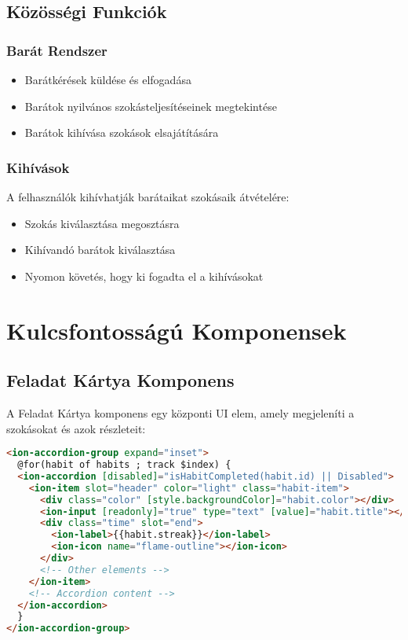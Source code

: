 \documentclass[12pt,a4paper]{report}
\begin{document}
\section{Közösségi Funkciók}
\subsection{Barát Rendszer}
\begin{itemize}
    \item Barátkérések küldése és elfogadása
    \item Barátok nyilvános szokásteljesítéseinek megtekintése
    \item Barátok kihívása szokások elsajátítására
\end{itemize}

\subsection{Kihívások}
A felhasználók kihívhatják barátaikat szokásaik átvételére:
\begin{itemize}
    \item Szokás kiválasztása megosztásra
    \item Kihívandó barátok kiválasztása
    \item Nyomon követés, hogy ki fogadta el a kihívásokat
\end{itemize}

\chapter{Kulcsfontosságú Komponensek}

\section{Feladat Kártya Komponens}
A Feladat Kártya komponens egy központi UI elem, amely megjeleníti a szokásokat és azok részleteit:

\begin{lstlisting}[language=html]
<ion-accordion-group expand="inset">
  @for(habit of habits ; track $index) {
  <ion-accordion [disabled]="isHabitCompleted(habit.id) || Disabled">
    <ion-item slot="header" color="light" class="habit-item">
      <div class="color" [style.backgroundColor]="habit.color"></div>
      <ion-input [readonly]="true" type="text" [value]="habit.title"></ion-input>
      <div class="time" slot="end">
        <ion-label>{{habit.streak}}</ion-label>
        <ion-icon name="flame-outline"></ion-icon>
      </div>
      <!-- Other elements -->
    </ion-item>
    <!-- Accordion content -->
  </ion-accordion>
  }
</ion-accordion-group>
\end{lstlisting}
\end{document}
